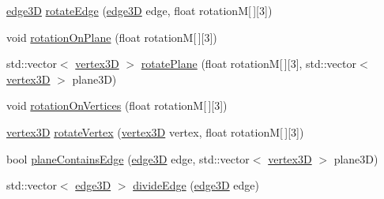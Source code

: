 \begin{DoxyCompactItemize}
\item 
\mbox{\hyperlink{structedge3_d}{edge3D}} \mbox{\hyperlink{class_two_d_obj_af24bd21a8a1319b6d075537e895d7f4f}{rotate\+Edge}} (\mbox{\hyperlink{structedge3_d}{edge3D}} edge, float rotationM\mbox{[}$\,$\mbox{]}\mbox{[}3\mbox{]})
\item 
void \mbox{\hyperlink{class_two_d_obj_a2627a8f625c1076f4261dd61724be835}{rotation\+On\+Plane}} (float rotationM\mbox{[}$\,$\mbox{]}\mbox{[}3\mbox{]})
\item 
std\+::vector$<$ \mbox{\hyperlink{structvertex3_d}{vertex3D}} $>$ \mbox{\hyperlink{class_two_d_obj_a7981f53246124f8ca4d267a04dfd9c87}{rotate\+Plane}} (float rotationM\mbox{[}$\,$\mbox{]}\mbox{[}3\mbox{]}, std\+::vector$<$ \mbox{\hyperlink{structvertex3_d}{vertex3D}} $>$ plane3D)
\item 
void \mbox{\hyperlink{class_two_d_obj_a68343b4431fd7282dde6fabbf7a231ce}{rotation\+On\+Vertices}} (float rotationM\mbox{[}$\,$\mbox{]}\mbox{[}3\mbox{]})
\item 
\mbox{\hyperlink{structvertex3_d}{vertex3D}} \mbox{\hyperlink{class_two_d_obj_a16583cd47ab05c87310f494ef00e16b7}{rotate\+Vertex}} (\mbox{\hyperlink{structvertex3_d}{vertex3D}} vertex, float rotationM\mbox{[}$\,$\mbox{]}\mbox{[}3\mbox{]})
\item 
bool \mbox{\hyperlink{class_two_d_obj_ab9d3420793d260703d8882196efccfc9}{plane\+Contains\+Edge}} (\mbox{\hyperlink{structedge3_d}{edge3D}} edge, std\+::vector$<$ \mbox{\hyperlink{structvertex3_d}{vertex3D}} $>$ plane3D)
\item 
std\+::vector$<$ \mbox{\hyperlink{structedge3_d}{edge3D}} $>$ \mbox{\hyperlink{class_two_d_obj_a708cefccdc3c40a8bfa5b4c345ba95df}{divide\+Edge}} (\mbox{\hyperlink{structedge3_d}{edge3D}} edge)
\end{DoxyCompactItemize}
